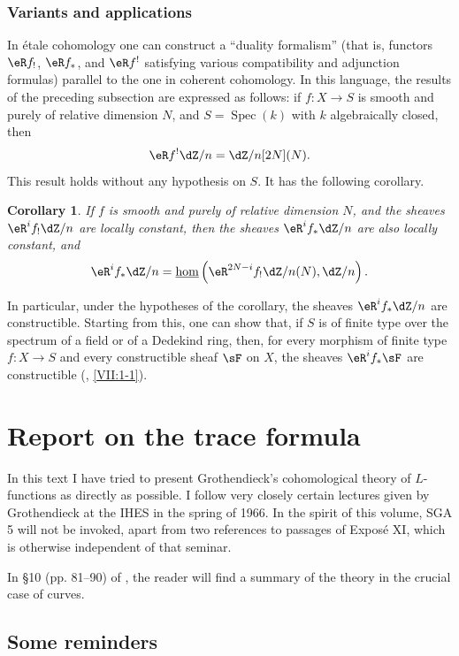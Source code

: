 \documentclass[12pt,oneside,english]{smfbook}
\DeclareMathOperator{\spec}{Spec}
\newcommand{\const}[1]{\underline{#1}}
\newtheorem{corollary}[subsubsection]{Corollary}
\begin{document}
\subsection{Variants and applications}\label{I:6-4}

In étale cohomology one can construct a ``duality formalism'' (that is, functors $\eR f_!$, $\eR f_*$, and $\eR f^!$ satisfying various compatibility and adjunction formulas) parallel to the one in coherent cohomology. In this language, the results of the preceding subsection are expressed as follows: if $f:X\to S$ is smooth and purely of relative dimension $N$, and $S=\spec(k)$ with $k$ algebraically closed, then
\[
  \eR f^! \dZ/n = \dZ/n [2N](N) \text{.}
\]
This result holds without any hypothesis on $S$. It has the following corollary.

\begin{corollary}\label{I:6-4-1}
If $f$ is smooth and purely of relative dimension $N$, and the sheaves $\eR^if_!\dZ/n$ are locally constant, then the sheaves $\eR^if_*\dZ/n$ are also locally constant, and
\[
  \eR^i f_* \dZ/n = \const\hom\left(\eR^{2 N-i} f_! \dZ/n(N),\dZ/n\right)\text{.}
\]
\end{corollary}

In particular, under the hypotheses of the corollary, the sheaves $\eR^if_*\dZ/n$ are constructible. Starting from this, one can show that, if $S$ is of finite type over the spectrum of a field or of a Dedekind ring, then, for every morphism of finite type $f:X\to S$ and every constructible sheaf $\sF$ on $X$, the sheaves $\eR^if_*\sF$ are constructible (, \ref{VII:1-1}).
\clearpage
\clearpage
\chapter{Report on the trace formula}\label{II}

In this text I have tried to present Grothendieck's cohomological theory of $L$-functions as directly as possible. I follow very closely certain lectures given by Grothendieck at the IHES in the spring of 1966. In the spirit of this volume, SGA 5 will not be invoked, apart from two references to passages of Exposé XI, which is otherwise independent of that seminar.

In \S 10 (pp. 81--90) of \cite{de73}, the reader will find a summary of the theory in the crucial case of curves.

\section{Some reminders}\label{II:1}
\end{document}
